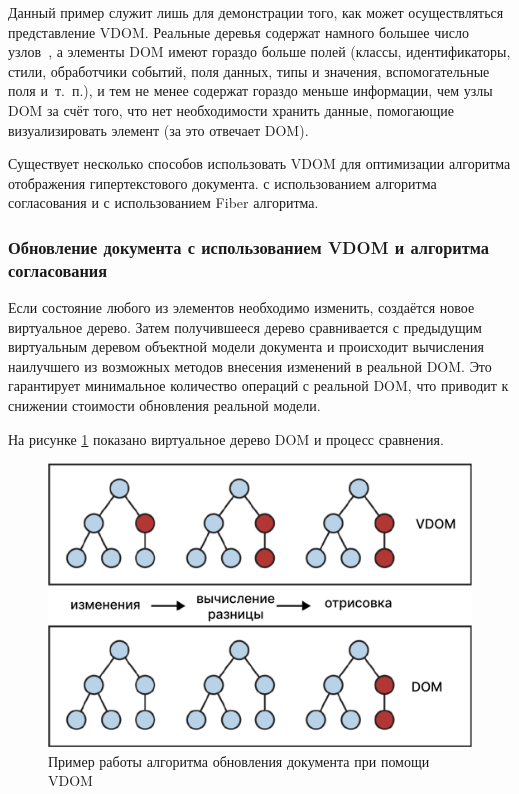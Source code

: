 
Данный пример служит лишь для демонстрации того, как может осуществляться представление VDOM.
Реальные деревья содержат намного большее число узлов~\cite{dom-element}, а элементы DOM имеют гораздо больше полей (классы, идентификаторы, стили, обработчики событий, поля данных, типы и значения, вспомогательные поля и~т.~п.), и тем не менее содержат гораздо меньше информации, чем узлы DOM за счёт того, что нет необходимости хранить данные, помогающие визуализировать элемент (за это отвечает DOM).

Существует несколько способов использовать VDOM для оптимизации алгоритма отображения гипертекстового документа. с использованием алгоритма согласования и с использованием Fiber алгоритма.

\subsubsection{Обновление документа с использованием VDOM и алгоритма согласования}

Если состояние любого из элементов необходимо изменить, создаётся новое виртуальное дерево.
Затем получившееся дерево сравнивается с предыдущим виртуальным деревом объектной модели документа и происходит вычисления наилучшего из возможных методов внесения изменений в реальной DOM.
Это гарантирует минимальное количество операций с реальной DOM, что приводит к снижении стоимости обновления реальной модели.

На рисунке \ref{fig:vdom-example} показано виртуальное дерево DOM и процесс сравнения.

\begin{figure}[h]
	\centering
	\captionsetup{justification=centering}
	\includegraphics[width=130mm]{img/vdom-example.png}
	\caption{Пример работы алгоритма обновления документа при помощи VDOM}
	\label{fig:vdom-example}
\end{figure}

